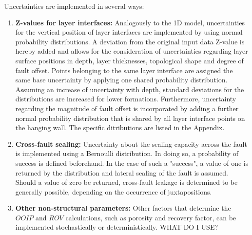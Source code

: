 		Uncertainties are implemented in several ways:
		\begin{enumerate}
		        \item \textbf{Z-values for layer interfaces:} Analogously to the 1D model, uncertainties for the vertical position of layer interfaces are implemented by using normal probability distributions. A deviation from the original input data Z-value is hereby added and allows for the consideration of uncertainties regarding layer surface positions in depth, layer thicknesses, topological shape and degree of fault offset. Points belonging to the same layer interface are assigned the same base uncertainty by applying one shared probability distribution. Assuming an increase of uncertainty with depth, standard deviations for the distributions are increased for lower formations. Furthermore, uncertainty regarding the magnitude of fault offset is incorporated by adding a further normal probability distribution that is shared by all layer interface points on the hanging wall. The specific ditributions are listed in the Appendix.
		        \item \textbf{Cross-fault sealing:} Uncertainty about the sealing capacity across the fault is implemented using a Bernoulli distribution. In doing so, a probability of success is defined beforehand. In the case of such a "success", a value of one is returned by the distribution and lateral sealing of the fault is assumed. Should a value of zero be returned, cross-fault leakage is determined to be generally possible, depending on the occurrence of juxtapositions.
		        \item \textbf{Other non-structural parameters:} Other factors that determine the $OOIP$ and $ROV$ calculations, such as porosity and recovery factor, can be implemented stochastically or deterministically. WHAT DO I USE?
		\end{enumerate}
		
